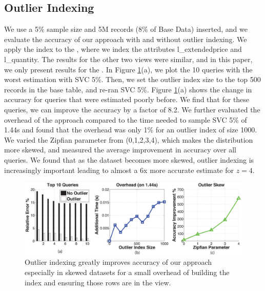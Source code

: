 \subsection{Outlier Indexing}
We use a 5\% sample size and 5M records (8\% of Base Data) inserted, and we evaluate the accuracy of our approach with and without outlier indexing.
We apply the index to the \spview, where we index the attributes l\_extendedprice and l\_quantity.
The results for the other two views were similar, and in this paper, we only present results for the \spview.
In Figure \ref{exp7outlier}(a), we plot the 10 queries with the worst estimation with SVC 5\%.
Then, we set the outlier index size to the top 500 records in the base table, and re-ran SVC 5\%.
Figure \ref{exp7outlier}(a) shows the change in accuracy for queries that were estimated poorly before.
We find that for these queries, we can improve the accuracy by a factor of 8.2.
We further evaluated the overhead of the approach compared to the time needed to sample SVC 5\% of 1.44s and found that the overhead was only 1\% for an outlier index of size 1000.
We varied the Zipfian parameter from (0,1,2,3,4), which makes the distribution more skewed, and measured the average improvement in accuracy over all queries.
We found that as the dataset becomes more skewed, outlier indexing is increasingly important leading to almost a 6x more accurate estimate for $z=4$.

\begin{figure}[ht!]
\includegraphics[trim = 45mm 0mm 45mm 0mm, clip,width=\columnwidth]{exp/exp7-outlier.eps}\vspace{-1em}
 \caption{Outlier indexing greatly improves accuracy of our approach especially in skewed datasets for a small overhead of building the index and ensuring those rows are in the view.\label{exp7outlier}}\vspace{-1em}
\end{figure}

